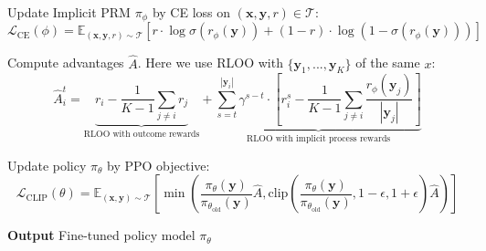 \begin{algorithm*}
\begin{algorithmic}[1]
        \State Update Implicit PRM $\pi_\phi$ by CE loss on $(\mathbf{x}, \mathbf{y}, r) \in \mathcal{T}$:
            \[
            \mathcal{L}_{\text{CE}}(\phi) = \mathbb{E}_{\left(\mathbf{x},\mathbf{y},r\right)\sim\mathcal{T}} \left[ r \cdot \log \sigma \left( r_\phi \left(\mathbf{y}\right) \right) + (1-r) \cdot \log\left( 1 - \sigma \left( r_\phi \left(\mathbf{y}\right) \right) \right) \right]
            \]

        \State Compute advantages $\hat{A}$. Here we use RLOO with $\{\mathbf{y}_1, ..., \mathbf{y}_K\}$ of the same $x$:
        \[\hat{A}_i^t = \underbrace{r_i-\frac{1}{K-1} \sum_{j \neq i} r_j}_\text{RLOO with outcome rewards} +  \underbrace{\sum_{s=t}^{|\mathbf{y}_i|} \gamma^{s-t} \cdot \left[r_i^s-\frac{1}{K-1} \sum_{j \neq i} \frac{r_\phi \left(\mathbf{y}_j\right)}{|\mathbf{y}_j|}\right]}_\text{RLOO with implicit process rewards}\]


        \State Update policy $\pi_\theta$ by PPO objective:
        \[\mathcal{L}_{\text{CLIP}}(\theta) = \mathbb{E}_{(\mathbf{x},\mathbf{y})\sim\mathcal{T}}\left[\min\left(\frac{\pi_\theta(\mathbf{y})}{\pi_{\theta_{\text{old}}}(\mathbf{y})}\hat{A}, \text{clip}\left(\frac{\pi_\theta(\mathbf{y})}{\pi_{\theta_{\text{old}}}(\mathbf{y})}, 1-\epsilon, 1+\epsilon\right)\hat{A}\right)\right]\]
    
        
    \EndFor

\EndFor
\end{algorithmic}
\textbf{Output} Fine-tuned policy model $\pi_\theta$

\end{algorithm*}